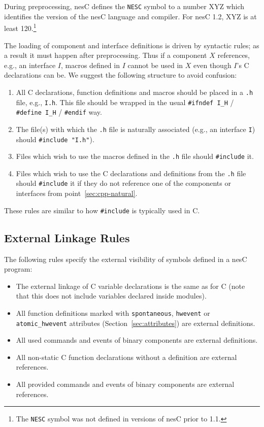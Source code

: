 \documentclass[11pt,letterpaper]{article}
\newcommand{\kw}[1]{{\tt #1}}
\newcommand{\code}[1]{{\tt #1}}
\newcommand{\file}[1]{{\tt #1}}
\newcommand{\nesc}{nesC\xspace}
\begin{document}
During preprocessing, \nesc defines the \kw{NESC} symbol to a number XYZ
which identifies the version of the \nesc language and compiler.  For \nesc
1.2, XYZ is at least 120.\footnote{The \kw{NESC} symbol was not defined in
versions of \nesc prior to 1.1.}

The loading of component and interface definitions is driven by syntactic
rules; as a result it must happen after preprocessing. Thus if a component
$X$ references, e.g., an interface $I$, macros defined in $I$ cannot be
used in $X$ even though $I$'s C declarations can be. We suggest the
following structure to avoid confusion:
\begin{enumerate}
\item All C declarations, function definitions and macros should be placed
in a \file{.h} file, e.g., \file{I.h}. This file should be wrapped in the
usual \code{\#ifndef I\_H} / \code{\#define I\_H} / \code{\#endif} way.

\item The file(s) with which the \file{.h} file is naturally associated
(e.g., an interface \code{I}) should \code{\#include "I.h"}).
\label{sec:cpp-natural}

\item Files which wish to use the macros defined in the \file{.h} file
should \code{\#include} it.

\item Files which wish to use the C declarations and definitions from
the \file{.h} file should \code{\#include} it if they do not reference one
of the components or interfaces from point~\ref{sec:cpp-natural}.
\end{enumerate}

These rules are similar to how \code{\#include} is typically used in C.

\subsection{External Linkage Rules}
\label{sec:linkage}

The following rules specify the external visibility of symbols defined
in a nesC program:
\begin{itemize}
\item The external linkage of C variable declarations is the same as for C
(note that this does not include variables declared inside modules).

\item All function definitions marked with \code{spontaneous},
\code{hwevent} or \code{atomic\_hwevent} attributes
(Section~\ref{sec:attributes}) are external definitions.

\item All used commands and events of binary components are external
definitions.

\item All non-static C function declarations without a definition
are external references.

\item All provided commands and events of binary components are
external references.
\end{itemize}
\end{document}
